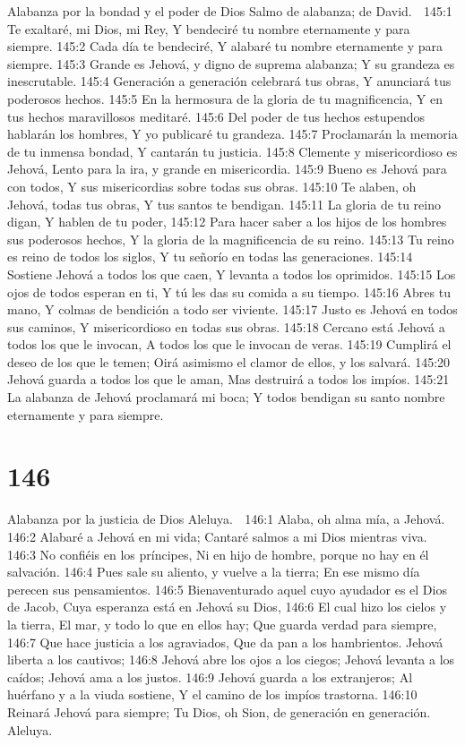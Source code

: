 Alabanza por la bondad y el poder de Dios 
Salmo de alabanza; de David. 

145:1 Te exaltaré, mi Dios, mi Rey, 
Y bendeciré tu nombre eternamente y para siempre. 
145:2 Cada día te bendeciré, 
Y alabaré tu nombre eternamente y para siempre. 
145:3 Grande es Jehová, y digno de suprema alabanza; 
Y su grandeza es inescrutable. 
145:4 Generación a generación celebrará tus obras, 
Y anunciará tus poderosos hechos. 
145:5 En la hermosura de la gloria de tu magnificencia, 
Y en tus hechos maravillosos meditaré. 
145:6 Del poder de tus hechos estupendos hablarán los hombres, 
Y yo publicaré tu grandeza. 
145:7 Proclamarán la memoria de tu inmensa bondad, 
Y cantarán tu justicia. 
145:8 Clemente y misericordioso es Jehová, 
Lento para la ira, y grande en misericordia. 
145:9 Bueno es Jehová para con todos, 
Y sus misericordias sobre todas sus obras. 
145:10 Te alaben, oh Jehová, todas tus obras, 
Y tus santos te bendigan. 
145:11 La gloria de tu reino digan, 
Y hablen de tu poder, 
145:12 Para hacer saber a los hijos de los hombres sus poderosos hechos, 
Y la gloria de la magnificencia de su reino. 
145:13 Tu reino es reino de todos los siglos, 
Y tu señorío en todas las generaciones. 
145:14 Sostiene Jehová a todos los que caen, 
Y levanta a todos los oprimidos. 
145:15 Los ojos de todos esperan en ti, 
Y tú les das su comida a su tiempo. 
145:16 Abres tu mano, 
Y colmas de bendición a todo ser viviente. 
145:17 Justo es Jehová en todos sus caminos, 
Y misericordioso en todas sus obras. 
145:18 Cercano está Jehová a todos los que le invocan, 
A todos los que le invocan de veras. 
145:19 Cumplirá el deseo de los que le temen; 
Oirá asimismo el clamor de ellos, y los salvará. 
145:20 Jehová guarda a todos los que le aman, 
Mas destruirá a todos los impíos. 
145:21 La alabanza de Jehová proclamará mi boca; 
Y todos bendigan su santo nombre eternamente y para siempre. 

\chapter{146}

Alabanza por la justicia de Dios 
Aleluya. 

146:1 Alaba, oh alma mía, a Jehová. 
146:2 Alabaré a Jehová en mi vida; 
Cantaré salmos a mi Dios mientras viva. 
146:3 No confiéis en los príncipes, 
Ni en hijo de hombre, porque no hay en él salvación. 
146:4 Pues sale su aliento, y vuelve a la tierra; 
En ese mismo día perecen sus pensamientos. 
146:5 Bienaventurado aquel cuyo ayudador es el Dios de Jacob, 
Cuya esperanza está en Jehová su Dios, 
146:6 El cual hizo los cielos y la tierra, 
El mar, y todo lo que en ellos hay; 
Que guarda verdad para siempre, 
146:7 Que hace justicia a los agraviados, 
Que da pan a los hambrientos. 
Jehová liberta a los cautivos; 
146:8 Jehová abre los ojos a los ciegos; 
Jehová levanta a los caídos; 
Jehová ama a los justos. 
146:9 Jehová guarda a los extranjeros; 
Al huérfano y a la viuda sostiene, 
Y el camino de los impíos trastorna. 
146:10 Reinará Jehová para siempre; 
Tu Dios, oh Sion, de generación en generación. 
Aleluya. 

